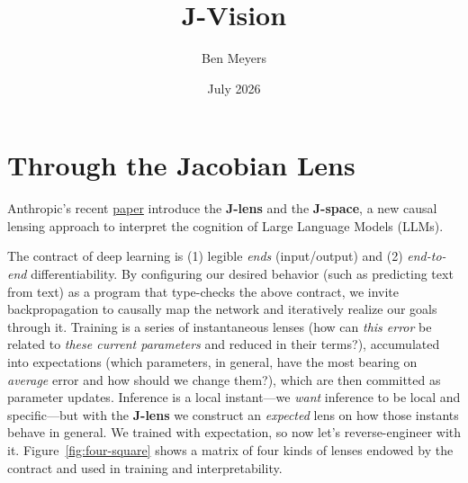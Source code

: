 \documentclass{article}
\title{J-Vision}
\author{Ben Meyers}
\date{July 2026}
\begin{document}
\maketitle

\section{Through the Jacobian Lens}

Anthropic's recent \href{https://transformer-circuits.pub/2026/workspace/index.html}{paper} introduce the \textbf{J-lens} and the \textbf{J-space}, a new causal lensing approach to interpret the cognition of Large Language Models (LLMs). 

The contract of deep learning is (1) legible \textit{ends} (input/output) and (2) \textit{end-to-end} differentiability. By configuring our desired behavior (such as predicting text from text) as a program that type-checks the above contract, we invite backpropagation to causally map the network and iteratively realize our goals through it. Training is a series of instantaneous lenses (how can \textit{this error} be related to \textit{these current parameters} and reduced in their terms?), accumulated into expectations (which parameters, in general, have the most bearing on \textit{average} error and how should we change them?), which are then committed as parameter updates. Inference is a local instant---we \textit{want} inference to be local and specific---but with the \textbf{J-lens} we construct an \textit{expected} lens on how those instants behave in general. We trained with expectation, so now let's reverse-engineer with it. Figure~\ref{fig:four-square} shows a matrix of four kinds of lenses endowed by the contract and used in training and interpretability. 
\end{document}
